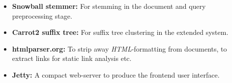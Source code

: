 \begin{itemize}
	\item \textbf{Snowball stemmer:} For stemming in the document and query preprocessing stage.
	\item \textbf{Carrot2 suffix tree:} For suffix tree clustering in the extended system. 
	\item \textbf{htmlparser.org:} To strip away \emph{HTML}-formatting from documents, to extract links for static link analysis etc.
	\item \textbf{Jetty:} A compact web-server to produce the frontend user interface. 	 
\end{itemize}